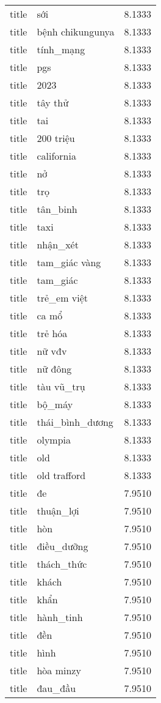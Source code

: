 \documentclass{article}
\begin{document}
\begin{tabular}{lll}
title & sới & 8.1333\\
title & bệnh chikungunya & 8.1333\\
title & tính\_mạng & 8.1333\\
title & pgs & 8.1333\\
title & 2023 & 8.1333\\
title & tây thử & 8.1333\\
title & tai & 8.1333\\
title & 200 triệu & 8.1333\\
title & california & 8.1333\\
title & nở & 8.1333\\
title & trọ & 8.1333\\
title & tân\_binh & 8.1333\\
title & taxi & 8.1333\\
title & nhận\_xét & 8.1333\\
title & tam\_giác vàng & 8.1333\\
title & tam\_giác & 8.1333\\
title & trẻ\_em việt & 8.1333\\
title & ca mổ & 8.1333\\
title & trẻ hóa & 8.1333\\
title & nữ vđv & 8.1333\\
title & nữ đông & 8.1333\\
title & tàu vũ\_trụ & 8.1333\\
title & bộ\_máy & 8.1333\\
title & thái\_bình\_dương & 8.1333\\
title & olympia & 8.1333\\
title & old & 8.1333\\
title & old trafford & 8.1333\\
title & đe & 7.9510\\
title & thuận\_lợi & 7.9510\\
title & hòn & 7.9510\\
title & điều\_dưỡng & 7.9510\\
title & thách\_thức & 7.9510\\
title & khách & 7.9510\\
title & khẩn & 7.9510\\
title & hành\_tinh & 7.9510\\
title & đền & 7.9510\\
title & hình & 7.9510\\
title & hòa minzy & 7.9510\\
title & đau\_đầu & 7.9510\\

\end{tabular}
\end{document}
